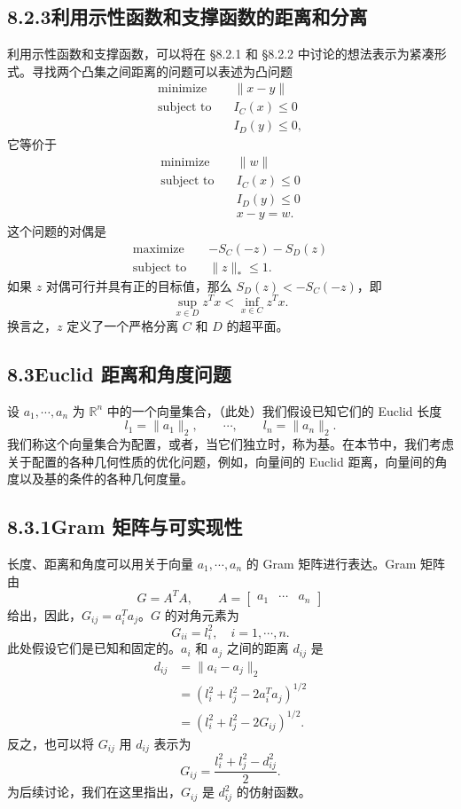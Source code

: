 \documentclass[UTF8, 12pt, fontset=fandol, oneside]{ctexart}
\begin{document}
\subsection*{8.2.3\quad 利用示性函数和支撑函数的距离和分离}

利用示性函数和支撑函数，可以将在 \S 8.2.1 和 \S 8.2.2 中讨论的想法表示为紧凑形式。寻找两个凸集之间距离的问题可以表述为凸问题
\[
\begin{aligned}
\text{minimize}\quad & \|x-y\|\\
\text{subject to}\quad & I_C(x)\leq 0\\
& I_D(y)\leq 0,
\end{aligned}
\]
它等价于
\[
\begin{aligned}
\text{minimize}\quad & \|w\|\\
\text{subject to}\quad & I_C(x)\leq 0\\
& I_D(y)\leq 0\\
& x-y=w.
\end{aligned}
\]
这个问题的对偶是
\[
\begin{aligned}
\text{maximize}\quad & -S_C(-z)-S_D(z)\\
\text{subject to}\quad & \|z\|_\ast\leq 1.
\end{aligned}
\]
如果 $z$ 对偶可行并具有正的目标值，那么 $S_D(z)<-S_C(-z)$，即
\[
\sup_{x\in D}z^Tx<\inf_{x\in C}z^Tx.
\]
换言之，$z$ 定义了一个严格分离 $C$ 和 $D$ 的超平面。

\subsection*{8.3\quad Euclid 距离和角度问题}

设 $a_1,\cdots,a_n$ 为 $\mathbb{R}^n$ 中的一个向量集合，（此处）我们假设已知它们的 Euclid 长度
\[
l_1=\|a_1\|_2,\qquad \cdots,\qquad l_n=\|a_n\|_2.
\]
我们称这个向量集合为配置，或者，当它们独立时，称为基。在本节中，我们考虑关于配置的各种几何性质的优化问题，例如，向量间的 Euclid 距离，向量间的角度以及基的条件的各种几何度量。

\subsection*{8.3.1\quad Gram 矩阵与可实现性}

长度、距离和角度可以用关于向量 $a_1,\cdots,a_n$ 的 Gram 矩阵进行表达。Gram 矩阵由
\[
G=A^TA,\qquad A=\begin{bmatrix}a_1&\cdots&a_n\end{bmatrix}
\]
给出，因此，$G_{ij}=a_i^Ta_j$。$G$ 的对角元素为
\[
G_{ii}=l_i^2,\quad i=1,\cdots,n.
\]
此处假设它们是已知和固定的。$a_i$ 和 $a_j$ 之间的距离 $d_{ij}$ 是
\[
\begin{aligned}
d_{ij}
&=\|a_i-a_j\|_2\\
&=(l_i^2+l_j^2-2a_i^Ta_j)^{1/2}\\
&=(l_i^2+l_j^2-2G_{ij})^{1/2}.
\end{aligned}
\]
反之，也可以将 $G_{ij}$ 用 $d_{ij}$ 表示为
\[
G_{ij}=\frac{l_i^2+l_j^2-d_{ij}^2}{2}.
\]
为后续讨论，我们在这里指出，$G_{ij}$ 是 $d_{ij}^2$ 的仿射函数。
\end{document}
